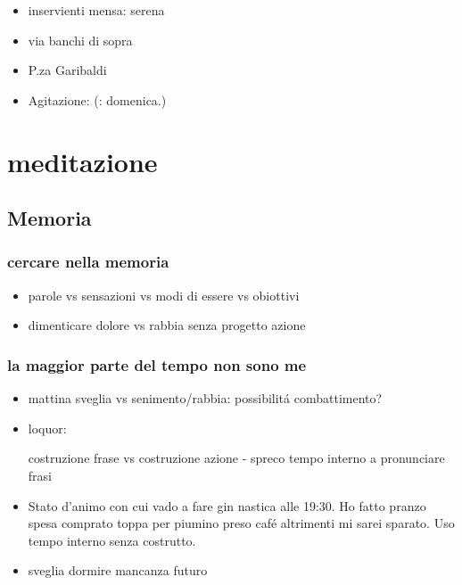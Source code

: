 \begin{itemize}

\item inservienti mensa: serena

\item via banchi di sopra

\item P.za Garibaldi

\item Agitazione: (: domenica.)

\end{itemize}


{\let\clearpage\relax
\chapter{meditazione}%
}
\PartialToc

\listofkeywords


\section{Memoria}

\subsection{cercare nella memoria}

\begin{itemize}

\item parole vs sensazioni vs modi di essere vs obiottivi

\item dimenticare dolore vs rabbia senza progetto azione 

\end{itemize}

\subsection{la maggior parte del tempo non sono me}

\begin{itemize}

\item mattina sveglia vs senimento/rabbia: possibilit\'a combattimento?

\item loquor:

costruzione frase vs costruzione azione - spreco tempo interno a pronunciare frasi

\item Stato d'animo con cui vado a fare gin nastica alle 19:30. Ho fatto pranzo spesa comprato toppa per piumino preso caf\'e altrimenti mi sarei sparato. Uso tempo interno senza costrutto.

\item sveglia dormire mancanza futuro

\end{itemize}

